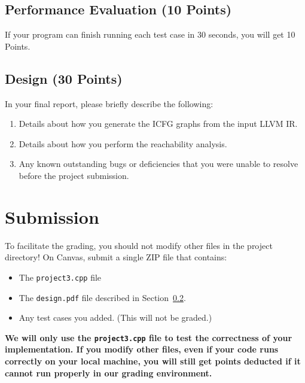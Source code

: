 \documentclass[12pt]{article}
\newcommand{\codeIn}[1]{{\small\tt{#1}}}
\begin{document}
\subsection{Performance Evaluation (10 Points)}\label{sec:eval}
If your program can finish running each test case in 30 seconds, you will get 10 Points.

\subsection{Design (30 Points)}\label{sec:design}

In your final report, 
please briefly describe the following:
%
\begin{enumerate}
\item Details about how you generate the ICFG graphs from the input LLVM IR.
\item Details about how you perform the reachability analysis.
\item Any known outstanding bugs or deficiencies that you were unable
  to   resolve before the project submission.
 \end{enumerate}

\section{Submission}\label{sec:sub}
To facilitate the grading, you should not modify
other files in the project directory!
On Canvas, submit a single ZIP file that contains:
\begin{itemize}
    \item The \codeIn{project3.cpp} file
    \item The \codeIn{design.pdf} file described in Section~\ref{sec:design}.
    \item Any test cases you added. (This will not be graded.)
\end{itemize}
\textbf{We will only use the \codeIn{project3.cpp} file to test the correctness of your implementation. If you modify other files, even if your code runs correctly on your local machine,
you will still get points deducted if it cannot run properly in our grading environment.}
\end{document}
